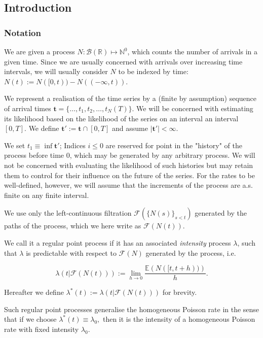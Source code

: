 \documentclass[11pt]{article}
\newcommand{\bb}[1]{\mathbb{#1}}
\renewcommand{\v}[1]{\boldsymbol{#1}}
\newcommand{\cc}[1]{\mathcal{#1}}
\renewcommand{\cc}[1]{\mathcal{#1}}
\begin{document}
    \subsection{Introduction}\label{introduction}

\subsubsection{Notation}\label{notation}

We are given a process \(N:\cc{B}(\bb{R})\mapsto \bb{N}^0\), which
counts the number of arrivals in a given time. Since we are usually
concerned with arrivals over increasing time intervals, we will usually
consider \(N\) to be indexed by time:
\(N(t):=N([0,t))-N((-\infty, t))\).

We represent a realisation of the time series by a (finite by
assumption) sequence of arrival times
\(\v{t}=\{\dots,t_1, t_2,\dots,t_N(T)\}.\) We will be concerned with
estimating its likelihood based on the likelihood of the series on an
interval an interval \([0,T]\). We define \(\v{t}':=\v{t}\cap [0,T]\)
and assume \(\left|\v{t}'\right|<\infty.\)

We set \(t_1\equiv \inf \v{t}'\); Indices \(i\leq 0\) are reserved for
point in the "history" of the process before time \(0\), which may be
generated by any arbitrary process. We will not be concerned with
evaluating the likelihood of such histories but may retain them to
control for their influence on the future of the series. For the rates
to be well-defined, however, we will assume that the increments of the
process are a.s. finite on any finite interval.

    We use only the left-continuous filtration
\(\mathcal{F}(\{N(s)\}_{s < t})\) generated by the paths of the process,
which we here write as \(\cc{F}(N(t)).\)

We call it a regular point process if it has an associated
\emph{intensity} process \(\lambda\), such that \(\lambda\) is
predictable with respect to \(\cc{F}(N)\) generated by the process, i.e.
\cite{daley_introduction_2003}

\[\lambda(t|\cc{F}(N(t))):=\lim_{h\to 0} \frac{\bb E\left(N([t,t+h))\right)}{h}.\]

Hereafter we define \(\lambda^*(t):=\lambda(t|\cc{F}(N(t)))\) for
brevity.

Such regular point processes generalise the homogeneous Poisson rate in
the sense that if we choose \(\lambda^*(t)\equiv \lambda_0,\) then it is
the intensity of a homogeneous Poisson rate with fixed intensity
\(\lambda_0\).
\end{document}
